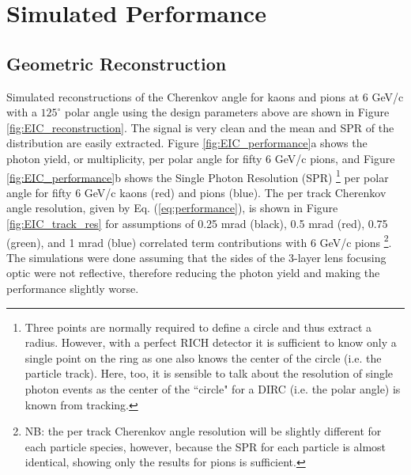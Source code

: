 
\clearpage
\section{Simulated Performance}

\subsection{Geometric Reconstruction}
Simulated reconstructions of the Cherenkov angle for kaons and pions at 6 GeV/c with a $125^{\circ}$ polar angle using the design parameters above are shown in Figure \ref{fig:EIC_reconstruction}. The signal is very clean and the mean and SPR of the distribution are easily extracted. Figure \ref{fig:EIC_performance}a shows the photon yield, or multiplicity, per polar angle for fifty 6 GeV/c pions, and Figure \ref{fig:EIC_performance}b shows the Single Photon Resolution (SPR) \footnote{Three points are normally required to define a circle and thus extract a radius. However, with a perfect RICH detector it is sufficient to know only a single point on the ring as one also knows the center of the circle (i.e. the particle track). Here, too, it is sensible to talk about the resolution of single photon events as the center of the ``circle" for a DIRC (i.e. the polar angle) is known from tracking.} per polar angle for fifty 6 GeV/c kaons (red) and pions (blue). The per track Cherenkov angle resolution, given by Eq. (\ref{eq:performance}), is shown in Figure \ref{fig:EIC_track_res} for assumptions of 0.25 mrad (black), 0.5 mrad (red), 0.75 (green), and 1 mrad (blue) correlated term contributions with 6 GeV/c pions \footnote{NB: the per track Cherenkov angle resolution will be slightly different for each particle species, however, because the SPR for each particle is almost identical, showing only the results for pions is sufficient.}.  The simulations were done assuming that the sides of the 3-layer lens focusing optic were not reflective, therefore reducing the photon yield and making the performance slightly worse.


